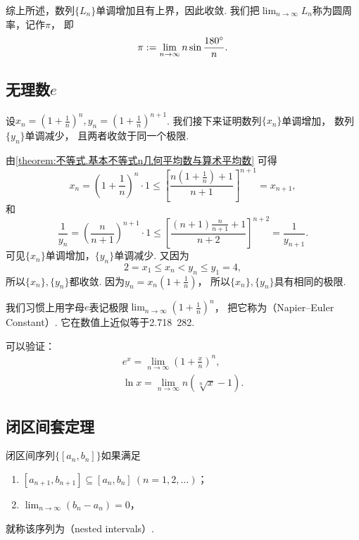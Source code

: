 综上所述，数列\(\{L_n\}\)单调增加且有上界，因此收敛.
我们把\(\lim_{n\to\infty} L_n\)称为圆周率，记作\(\pi\)，
即\[
	\pi := \lim_{n\to\infty} n \sin\frac{180^\circ}{n}.
\]


\subsection{无理数\texorpdfstring{$e$}{e}}\label{section:极限.无理数e}
设\(x_n=\left(1+\frac1n\right)^n,
y_n=\left(1+\frac1n\right)^{n+1}\).
我们接下来证明数列\(\{x_n\}\)单调增加，
数列\(\{y_n\}\)单调减少，
且两者收敛于同一个极限.

由\cref{theorem:不等式.基本不等式n几何平均数与算术平均数} 可得\[
	x_n = \left(1+\frac1n\right)^n \cdot 1
	\leq \left[\frac{n\left(1+\frac1n\right)+1}{n+1}\right]^{n+1} = x_{n+1},
\]
和\[
	\frac1{y_n} = \left(\frac{n}{n+1}\right)^{n+1} \cdot 1
	\leq \left[\frac{(n+1)\frac{n}{n+1}+1}{n+2}\right]^{n+2} = \frac1{y_{n+1}}.
\]
可见\(\{x_n\}\)单调增加，\(\{y_n\}\)单调减少.
又因为\[
	2 = x_1 \leq x_n < y_n \leq y_1 = 4,
\]
所以\(\{x_n\},\{y_n\}\)都收敛.
因为\(y_n=x_n\left(1+\frac1n\right)\)，
所以\(\{x_n\},\{y_n\}\)具有相同的极限.

我们习惯上用字母\(e\)表记极限\(\lim_{n\to\infty} \left(1+\frac1n\right)^n\)，
把它称为（Napier--Euler Constant）.
它在数值上近似等于{2.718~282}.

可以验证：\begin{gather}
	e^x = \lim_{n\to\infty} \left(1+\frac{x}{n}\right)^n,
	\label{equation:特殊函数.以e为底的指数函数} \\
	\ln x = \lim_{n\to\infty} n \left( \sqrt[n]{x} - 1 \right).
	\label{equation:特殊函数.以e为底的对数函数}
\end{gather}

\subsection{闭区间套定理}
\begin{definition}\label{definition:极限.闭区间套的定义}
闭区间序列\(\{[a_n,b_n]\}\)如果满足
\begin{enumerate}
	\item \([a_{n+1},b_{n+1}] \subseteq [a_n,b_n]\ (n=1,2,\dotsc)\)；
	\item \(\lim_{n\to\infty} (b_n - a_n) = 0\)，
\end{enumerate}
就称该序列为（nested intervals）.
\end{definition}

